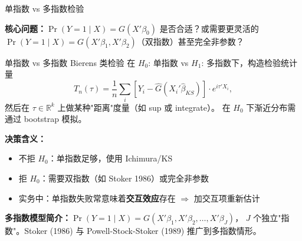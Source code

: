 \documentclass[aspectratio=169, 10pt]{beamer}
\begin{document}
\begin{frame}[shrink=12]{单指数 vs 多指数检验}

  \textbf{核心问题：}$\Pr(Y=1\mid X) = G(X'\beta_0)$ 是否合适？或需要更灵活的
  $\Pr(Y=1\mid X) = G(X'\beta_1, X'\beta_2)$（双指数）甚至完全非参数？

  \begin{definitionbox}{{单指数 vs 多指数 Bierens 类检验}}
    在 $H_0$: 单指数 vs $H_1$: 多指数下，构造检验统计量
    $$T_n(\tau) = \frac{1}{n}\sum_i [Y_i - \hat G(X_i'\hat\beta_{KS})] \cdot e^{i \tau' X_i},$$
    然后在 $\tau \in \mathbb{R}^k$ 上做某种"距离"度量（如 sup 或 integrate）。
    在 $H_0$ 下渐近分布需通过 bootstrap 模拟。
  \end{definitionbox}

  \begin{highlightbox}
    \textbf{决策含义：}
    \begin{itemize}\setlength{\itemsep}{1pt}
      \item 不拒 $H_0$：单指数足够，使用 Ichimura/KS
      \item 拒 $H_0$：需要双指数（如 Stoker 1986）或完全非参数
      \item 实务中：单指数失败常意味着\textbf{交互效应}存在 $\Rightarrow$ 加交互项重新估计
    \end{itemize}
  \end{highlightbox}

  \begin{keybox}
    \textbf{多指数模型简介：}$\Pr(Y=1\mid X) = G(X'\beta_1, X'\beta_2, \ldots, X'\beta_J)$，
    $J$ 个独立"指数"。Stoker (1986) 与 Powell-Stock-Stoker (1989) 推广到多指数情形。
  \end{keybox}

\end{frame}
\end{document}
